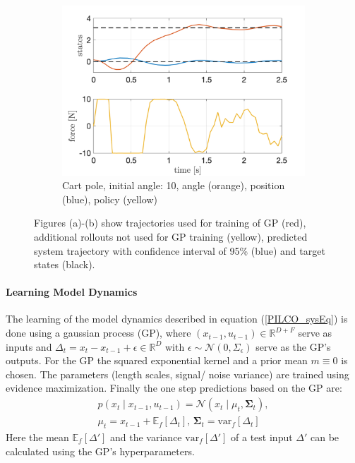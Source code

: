 \documentclass[letterpaper, 10 pt, conference]{ieeeconf}  %
\begin{document}
\begin{figure}[!thp]
\begin{subfigure}{0.325\textwidth}
	\includegraphics[width=\textwidth]{cp_quad.png}
	\caption{Cart pole, initial angle: 10\textdegree, angle (orange), position (blue), policy (yellow)}\label{fig:PILCO_cp}
	\end{subfigure}\caption{Figures (a)-(b) show trajectories used for training of GP (red), additional rollouts not used for GP training (yellow), predicted system trajectory with confidence interval of 95\% (blue) and target states (black).}\label{fig:PILCO}
\end{figure} 
\paragraph{Learning Model Dynamics}
The learning of the model dynamics described in equation (\ref{PILCO_sysEq}) is done using a gaussian process (GP), where $\left(x_{t-1},u_{t-1}\right) \in \mathbb{R}^{D+F}$ serve as inputs and $\Delta_t = x_{t} - x_{t-1} + \epsilon \in \mathbb{R}^D$ with $\epsilon \sim \mathcal{N}\left(0,\Sigma_\epsilon\right)$ serve as the GP's outputs. For the GP the squared exponential kernel and a prior mean $m\equiv 0$ is chosen. The parameters (length scales, signal/ noise variance) are trained using evidence maximization. Finally the one step predictions based on the GP are:
\begin{align}
p(x_t\mid x_{t-1}, u_{t-1}) = \mathcal{N} \left(x_t \mid \mu_t, \mathbf{\Sigma}_t \right),\label{PILCO_GPp}\\
\mu_t = x_{t-1} + \mathbb{E}_f \left[ \Delta_t \right],\, \mathbf{\Sigma}_t = \text{var}_f \left[ \Delta_t \right]\label{PILCO_GPmu_sigma}
\end{align}
Here the mean $\mathbb{E}_f\left[\Delta'\right]$ and the variance $\text{var}_f\left[\Delta'\right]$ of a test input $\Delta'$ can be calculated using the GP's hyperparameters\cite{PILCO_paper}.
\end{document}
